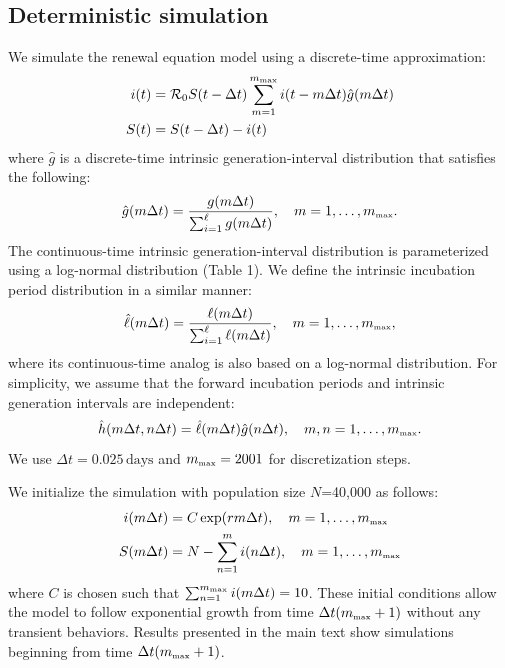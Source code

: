 \documentclass[12pt]{article}
\newcommand{\Rx}[1]{\ensuremath{{\mathcal R}_{#1}}\xspace}
\newcommand{\Ro}{\Rx{0}}
\newcommand{\tsub}[2]{#1_{{\textrm{\tiny #2}}}}
\newcommand{\gdist}{g} %
\newcommand{\idist}{\ell} %
\begin{document}
\subsection{Deterministic simulation}

We simulate the renewal equation model using a discrete-time approximation:
\begin{align}
i(t) &= \Ro S(t-\Delta t) \sum_{m=1}^{\tsub{m}{max}} i(t-m \Delta t) \hat{\gdist}(m \Delta t) \nonumber \\
S(t) &= S(t-\Delta t) - i(t)
\end{align}
where $\hat{\gdist}$ is a discrete-time intrinsic generation-interval distribution that satisfies the following:
\begin{equation}
\hat{\gdist}(m \Delta t) = \frac{\gdist(m \Delta t)}{\sum_{i=1}^\ell \gdist(m \Delta t)}, \quad m=1, \dots, \tsub{m}{max}.
\end{equation}
The continuous-time intrinsic generation-interval distribution is parameterized using a log-normal distribution (Table 1). We define the intrinsic incubation period distribution in a similar manner:
\begin{equation}
\hat{\idist}(m \Delta t) = \frac{\idist(m \Delta t)}{\sum_{i=1}^\ell \idist(m \Delta t)}, \quad m=1, \dots, \tsub{m}{max},
\end{equation}
where its continuous-time analog is also based on a log-normal distribution.
For simplicity, we assume that the forward incubation periods and intrinsic generation intervals are independent:
\begin{equation}
\hat{h}(m \Delta t, n \Delta t) = \hat{\idist}(m \Delta t)\hat{\gdist}(n \Delta t), \quad m,n=1, \dots, \tsub{m}{max}.
\end{equation}
We use $\Delta t = 0.025\,\textrm{days}$ and $\tsub{m}{max}=2001$ for discretization steps.

We initialize the simulation with population size $N$=40,000 as follows:
\begin{align}
i(m \Delta t) &= C \exp(r m \Delta t), \quad m=1, \dots, \tsub{m}{max}\nonumber \\
S(m \Delta t) &= N - \sum_{n=1}^m i(n \Delta t), \quad m=1, \dots, \tsub{m}{max}
\end{align}
where $C$ is chosen such that $\sum_{n=1}^{\tsub{m}{max}} i(m \Delta t)=10$.
These initial conditions allow the model to follow exponential growth from time $\Delta t (\tsub{m}{max} + 1)$ without any transient behaviors.
Results presented in the main text show simulations beginning from time $\Delta t (\tsub{m}{max} + 1)$.
\end{document}
